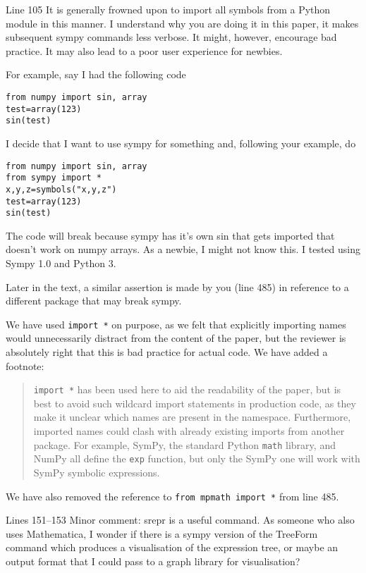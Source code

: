 \documentclass[answers,12pt]{exam}
\begin{document}
\begin{questions}
\question Line 105
It is generally frowned upon to import all symbols from a Python module in this manner.
I understand why you are doing it in this paper, it makes subsequent sympy commands less verbose.
It might, however, encourage bad practice. It may also lead to a poor user experience for newbies.
\label{rev2point1}

For example, say I had the following code

\begin{verbatim}
from numpy import sin, array
test=array(123)
sin(test)
\end{verbatim}

I decide that I want to use sympy for something and, following your example, do

\begin{verbatim}
from numpy import sin, array
from sympy import *
x,y,z=symbols("x,y,z")
test=array(123)
sin(test)
\end{verbatim}

The code will break because sympy has it's own sin that gets imported that doesn't work on numpy arrays. As a newbie, I might not know this.
I tested using Sympy 1.0 and Python 3.

Later in the text, a similar assertion is made by you (line 485) in reference to a different package that may break sympy.

\begin{solution}
We have used \verb|import *| on purpose, as we felt that explicitly importing
names would unnecessarily distract from the content of the paper, but the
reviewer is absolutely right that this is bad practice for actual code. We
have added a footnote:
\begin{quote}\texttt{import *} has been used here to aid the
  readability of the paper, but is best to avoid such wildcard import
  statements in production code, as they make it unclear which names are
  present in the namespace. Furthermore, imported names could clash with
  already existing imports from another package. For example, SymPy, the
  standard Python \texttt{math} library, and NumPy all define the \texttt{exp}
  function, but only the SymPy one will work with SymPy symbolic expressions.
\end{quote}

We have also removed the reference to \texttt{from mpmath import *} from line 485.
\end{solution}

\question Lines 151--153
Minor comment: srepr is a useful command. As someone who also uses Mathematica, I wonder if there is a sympy version of the TreeForm command which produces a visualisation of the expression tree, or maybe an output format that I could pass to a graph library for visualisation?


\end{questions}
\end{document}
